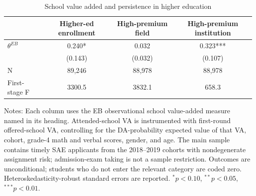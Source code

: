 \begin{table}[!htbp]
\centering
\caption{School value added and persistence in higher education}
\label{tab:va-higher-ed-persistence}
\begin{threeparttable}
\begin{tabular}{lccc}
\toprule
 & Higher-ed enrollment & High-premium field & High-premium institution \\
\midrule
$\theta^{EB}$ & 0.240* & 0.032 & 0.323*** \\
 & (0.143) & (0.032) & (0.107) \\
N & 89,246 & 88,978 & 88,978 \\
First-stage F & 3300.5 & 3832.1 & 658.3 \\
\bottomrule
\end{tabular}
\begin{tablenotes}[flushleft]
\footnotesize
\item Notes: Each column uses the EB observational school value-added measure named in its heading. Attended-school VA is instrumented with first-round offered-school VA, controlling for the DA-probability expected value of that VA, cohort, grade-4 math and verbal scores, gender, and age. The main sample contains timely SAE applicants from the 2018--2019 cohorts with nondegenerate assignment risk; admission-exam taking is not a sample restriction. Outcomes are unconditional; students who do not enter the relevant category are coded zero. Heteroskedasticity-robust standard errors are reported. $^{*}p<0.10$, $^{**}p<0.05$, $^{***}p<0.01$.
\end{tablenotes}
\end{threeparttable}
\end{table}
